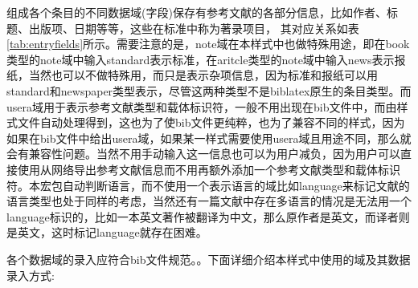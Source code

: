 组成各个条目的不同数据域(字段)保存有参考文献的各部分信息，比如作者、标题、出版项、日期等等，这些在标准中称为著录项目，
其对应关系如表\ref{tab:entryfields}所示。需要注意的是，note域在本样式中也做特殊用途，即在book类型的note域中输入standard表示标准，在aritcle类型的note域中输入news表示报纸，当然也可以不做特殊用，而只是表示杂项信息，因为标准和报纸可以用standard和newspaper类型表示，尽管这两种类型不是biblatex原生的条目类型。而usera域用于表示参考文献类型和载体标识符，一般不用出现在bib文件中，而由样式文件自动处理得到，这也为了使bib文件更纯粹，也为了兼容不同的样式，因为如果在bib文件中给出usera域，如果某一样式需要使用usera域且用途不同，那么就会有兼容性问题。当然不用手动输入这一信息也可以为用户减负，因为用户可以直接使用从网络导出参考文献信息而不用再额外添加一个参考文献类型和载体标识符。本宏包自动判断语言，而不使用一个表示语言的域比如language来标记文献的语言类型也处于同样的考虑，当然还有一篇文献中存在多语言的情况是无法用一个language标识的，比如一本英文著作被翻译为中文，那么原作者是英文，而译者则是英文，这时标记language就存在困难。

各个数据域的录入应符合bib文件规范。。下面详细介绍本样式中使用的域及其数据录入方式:

